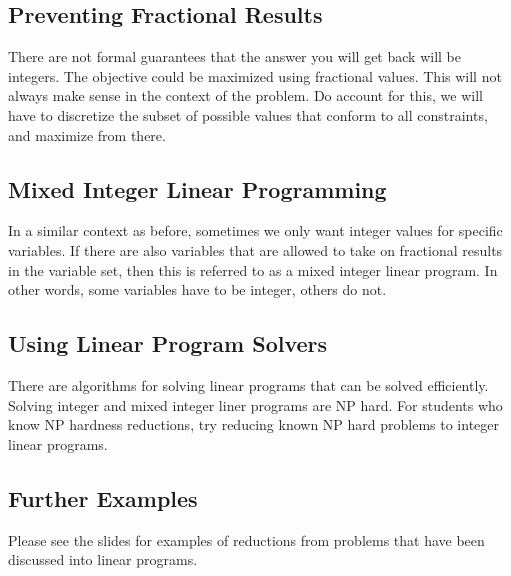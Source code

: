 \documentclass[letterpaper]{article} %
\begin{document}
\subsection{Preventing Fractional Results}

There are not formal guarantees that the answer you will get back will be integers. The objective could be maximized using fractional values. This will not always make sense in the context of the problem. Do account for this, we will have to discretize the subset of possible values that conform to all constraints, and maximize from there.

\subsection{Mixed Integer Linear Programming}

In a similar context as before, sometimes we only want integer values for specific variables. If there are also variables that are allowed to take on fractional results in the variable set, then this is referred to as a mixed integer linear program. In other words, some variables have to be integer, others do not.

\subsection{Using Linear Program Solvers}

There are algorithms for solving linear programs that can be solved efficiently. Solving integer and mixed integer liner programs are NP hard. For students who know NP hardness reductions, try reducing known NP hard problems to integer linear programs.

\subsection{Further Examples}

Please see the slides for examples of reductions from problems that have been discussed into linear programs.
\end{document}
